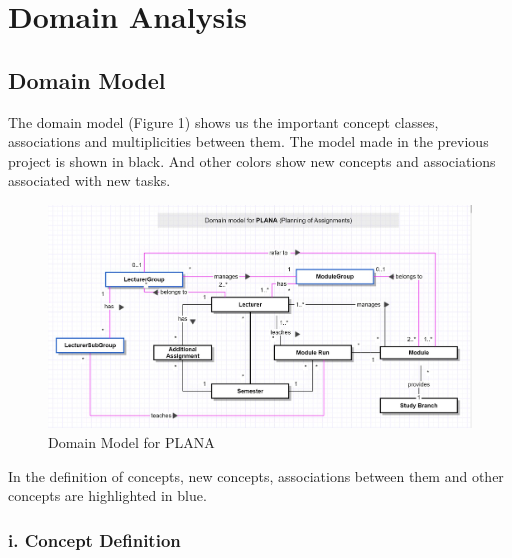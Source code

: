 \documentclass{scrartcl}
\begin{document}
\section{Domain Analysis}
\subsection{Domain Model}
The domain model (Figure 1) shows us the important concept classes, associations and
multiplicities between them. The model made in the previous project is shown in black. And other colors show new concepts and associations associated with new tasks.

\begin{figure}[h]
\centering
\includegraphics[width=150mm]{uml/domain-b.JPG}
\caption{Domain Model for PLANA}
\label{blabla}
\end{figure}

In the definition of concepts, new concepts, associations between them and other concepts are highlighted in blue.

	    \subsubsection{i. Concept Definition}
	    
\end{document}
